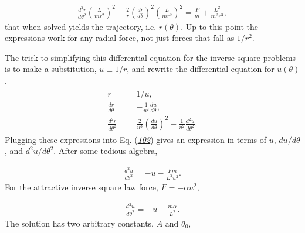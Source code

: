 \documentclass[letterpaper,10pt,english]{sphinxmanual}
\begin{document}
\begin{equation*}
\begin{split}
\begin{equation}
\label{eq:rdotdot} \tag{102}
\frac{d^2r}{d\theta^2}\left(\frac{L}{mr^2}\right)^2
-\frac{2}{r}\left(\frac{dr}{d\theta}\right)^2\left(\frac{L}{mr^2}\right)^2
=\frac{F}{m}+\frac{L^2}{m^2r^3},
\end{equation}
\end{split}
\end{equation*}
that when solved yields the trajectory, i.e. \(r(\theta)\). Up to this
point the expressions work for any radial force, not just forces that
fall as \(1/r^2\).

The trick to simplifying this differential equation for the inverse
square problems is to make a substitution, \(u\equiv 1/r\), and rewrite
the differential equation for \(u(\theta)\).
\begin{equation*}
\begin{split}
\begin{eqnarray}
r&=&1/u,\\
\nonumber
\frac{dr}{d\theta}&=&-\frac{1}{u^2}\frac{du}{d\theta},\\
\nonumber
\frac{d^2r}{d\theta^2}&=&\frac{2}{u^3}\left(\frac{du}{d\theta}\right)^2-\frac{1}{u^2}\frac{d^2u}{d\theta^2}.
\end{eqnarray}
\end{split}
\end{equation*}
Plugging these expressions into Eq. ({\hyperref[\detokenize{chapter1:eq:rdotdot}]{\emph{102}}}) gives an
expression in terms of \(u\), \(du/d\theta\), and \(d^2u/d\theta^2\). After
some tedious algebra,




\begin{equation*}
\begin{split}
\begin{equation}
\frac{d^2u}{d\theta^2}=-u-\frac{F m}{L^2u^2}.
\label{_auto75} \tag{103}
\end{equation}
\end{split}
\end{equation*}
For the attractive inverse square law force, \(F=-\alpha u^2\),




\begin{equation*}
\begin{split}
\begin{equation}
\frac{d^2u}{d\theta^2}=-u+\frac{m\alpha}{L^2}.
\label{_auto76} \tag{104}
\end{equation}
\end{split}
\end{equation*}
The solution has two arbitrary constants, \(A\) and \(\theta_0\),
\end{document}
